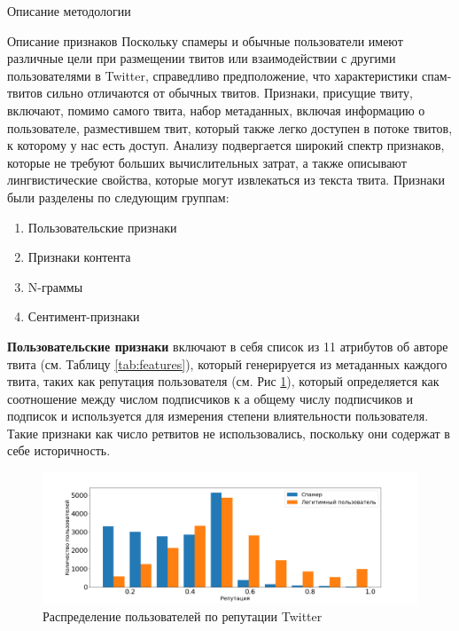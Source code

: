 \begin{section}{Описание методологии}
  \begin{subsection}{Описание признаков}
    Поскольку спамеры и обычные пользователи имеют различные цели при размещении твитов или взаимодействии с другими пользователями в Twitter, справедливо предположение, что характеристики спам-твитов сильно отличаются от обычных твитов.
    Признаки, присущие твиту, включают, помимо самого твита, набор метаданных, включая информацию о пользователе, разместившем твит, который также легко доступен в потоке твитов, к которому у нас есть доступ.
    Анализу подвергается широкий спектр признаков, которые не требуют больших вычислительных затрат, а также описывают лингвистические свойства, которые могут извлекаться из текста твита.
    Признаки были разделены по следующим группам:
    \begin{enumerate}
      \item Пользовательские признаки
      \item Признаки контента
      \item N-граммы
      \item Сентимент-признаки
    \end{enumerate}

    \textbf{Пользовательские признаки} включают в себя список из 11 атрибутов об авторе твита (см. Таблицу \ref{tab:features}), который генерируется из метаданных каждого твита, таких как репутация пользователя \cite{Wang} (см. Рис \ref{pic:reputation}), который определяется как соотношение между числом подписчиков к а общему числу подписчиков и подписок и используется для измерения степени влиятельности пользователя. Такие признаки как число ретвитов не использовались, поскольку они содержат в себе историчность.

    \begin{figure}[ht!]
    \centering
    \includegraphics[width=1.0\textwidth]{pics/reputation}
    \caption{Распределение пользователей по репутации Twitter}
    \label{pic:reputation}
    \end{figure}


\end{subsection}
\end{section}

